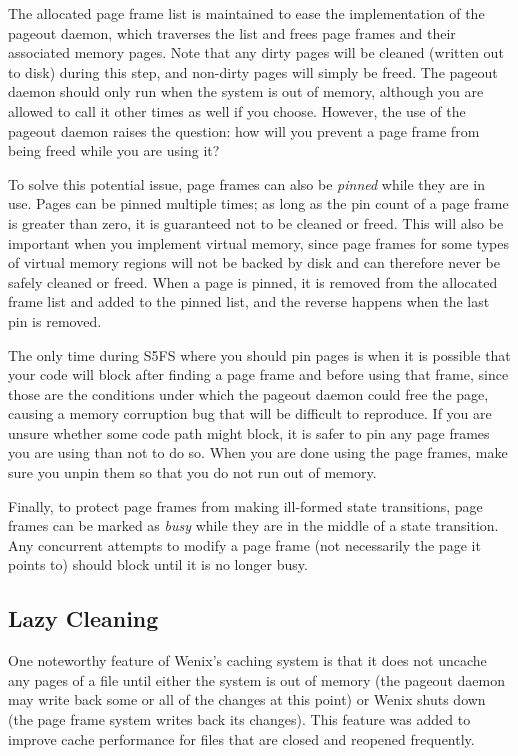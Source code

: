 The allocated page frame list is maintained to ease the implementation of the pageout daemon, which traverses the list and frees page frames and their associated memory pages. Note that any dirty pages will be cleaned (written out to disk) during this step, and non-dirty pages will simply be freed. The pageout daemon should only run when the system is out of memory, although you are allowed to call it other times as well if you choose. However, the use of the pageout daemon raises the question: how will you prevent a page frame from being freed while you are using it?

To solve this potential issue, page frames can also be \emph{pinned} while they are in use. Pages can be pinned multiple times; as long as the pin count of a page frame is greater than zero, it is guaranteed not to be cleaned or freed. This will also be important when you implement virtual memory, since page frames for some types of virtual memory regions will not be backed by disk and can therefore never be safely cleaned or freed. When a page is pinned, it is removed from the allocated frame list and added to the pinned list, and the reverse happens when the last pin is removed.

The only time during S5FS where you should pin pages is when it is possible that your code will block after finding a page frame and before using that frame, since those are the conditions under which the pageout daemon could free the page, causing a memory corruption bug that will be difficult to reproduce. If you are unsure whether some code path might block, it is safer to pin any page frames you are using than not to do so. When you are done using the page frames, make sure you unpin them so that you do not run out of memory.

Finally, to protect page frames from making ill-formed state transitions, page frames can be marked as \emph{busy} while they are in the middle of a state transition. Any concurrent attempts to modify a page frame (not necessarily the page it points to) should block until it is no longer busy.

\subsection{Lazy Cleaning}

One noteworthy feature of Wenix's caching system is that it does not uncache any pages of a file until either the system is out of memory (the pageout daemon may write back some or all of the changes at this point) or Wenix shuts down (the page frame system writes back its changes). This feature was added to improve cache performance for files that are closed and reopened frequently.

